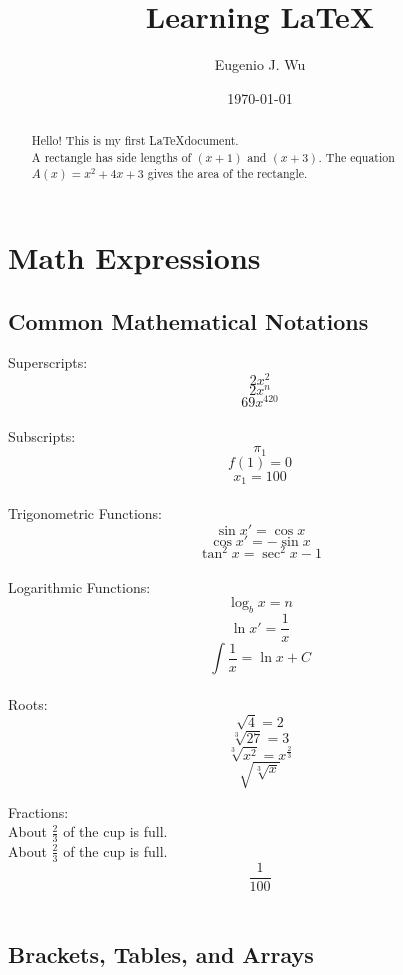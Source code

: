 \documentclass[12pt]{article}
\title{Learning \LaTeX}
\author{Eugenio J. Wu}
\date{\today}
\begin{document}
\maketitle 
\begin{abstract}
    \noindent 
    Hello! This is my first \LaTeX document. \\[5pt]
    A rectangle has side lengths of $(x + 1)$ and $(x + 3)$. The equation ${  A(x) = x^2 + 4x + 3  }$ gives the area of the rectangle. \\[5pt]    
\end{abstract} \pagebreak


\tableofcontents \pagebreak


\section{Math Expressions}
\subsection{Common Mathematical Notations}

Superscripts: \\[5pt]
$${  2x^2  }$$
$${  2x^n  }$$
$${  69x^{420}  }$$ \\[5pt]

Subscripts: \\[5pt]
$${  \pi_1  }$$
$${  f(1) = 0  }$$
$${  x_1 = 100  }$$ \\[5pt]

Trigonometric Functions: \\[5pt]
$${  \sin x' = \cos x  }$$
$${  \cos x' = -\sin x  }$$
$${  \tan ^2x = \sec ^2x - 1  }$$ \\[5pt]

Logarithmic Functions: \\[5pt]
$${  \log _b x = n  }$$
$${  \ln x' = \frac{1}{x}  }$$
$${  \int \frac{1}{x} = \ln x + C}$$ \\[5pt]

Roots: \\[5pt]
$${  \sqrt{4} = 2  }$$
$${  \sqrt[3]{27} = 3  }$$
$${  \sqrt[3]{x^2} = x^\frac{2}{3}  }$$
$${  \sqrt{  \sqrt[3]{x}  }  }$$

Fractions: \\[5pt]
About ${  \frac{2}{3}  }$ of the cup is full. \\[5pt]
About ${  \displaystyle \frac{2}{3}  }$ of the cup is full.
$${  \frac{1}{100}  }$$ \\[5pt]


\subsection{Brackets, Tables, and Arrays}
\end{document}
